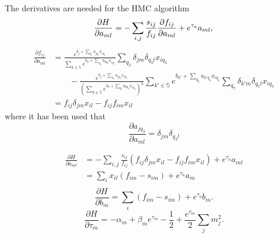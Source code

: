 \begin{example}
	The derivatives are needed for the HMC algorithm
	\begin{equation}
		\frac{\partial H}{\partial a_{ml}} = -\sum_{i,j}\frac{s_{ij}}{f_{ij}}\frac{\partial f_{ij}}{\partial a_{ml}}+e^{\tau_a}a_{ml},\\
	\end{equation}
	\begin{equation}
		\begin{split}
			\frac{\partial f_{ij}}{\partial a_{ml}} & = \frac{e^{b_j+\sum_{q_1}a_{jq_1}x_{iq_1}}}{\sum_{k\in \mathbb{S}}e^{b_k+\sum_{q_2}a_{kq_2}x_{iq_2}}}\sum_{q_3}\delta_{jm}\delta_{q_3l}x_{iq_3}\\
			&\qquad-\frac{e^{b_j+\sum_{q_4}a_{jq_4}x_{iq_4}}}{(\sum_{k\in \mathbb{S}}e^{b_k+\sum_{q_5}a_{kq_5}x_{iq_5}})^2}\sum_{k'\in \mathbb{S}}e^{b_{k'}+\sum_{q_6}a_{k'q_6}x_{iq_6}}\sum_{q_7}\delta_{k'm}\delta_{q_7l}x_{iq_7}\\
			& = f_{ij}\delta_{jm}x_{il}- f_{ij}f_{im}x_{il}
		\end{split}
	\end{equation}
	where it has been used that
	\begin{equation}
		\frac{\partial a_{jq_3}}{\partial a_{ml}} = \delta_{jm}\delta_{q_3l}
	\end{equation}
	
	\begin{equation}
		\begin{split}
			\frac{\partial H}{\partial a_{ml}} &= -\sum_{i,j}\frac{s_{ij}}{f_{ij}}(f_{ij}\delta_{jm}x_{il}- f_{ij}f_{im}x_{il})+e^{\tau_a}a_{ml}\\
			& = \sum_ix_{il}(f_{im}-s_{im})+e^{\tau_a}a_m\\
		\end{split}
	\end{equation}
	\begin{equation}
		\frac{\partial H}{\partial b_m} = \sum_i(f_{im}-s_{im})+e^{\tau_b}b_m.
	\end{equation}
	\begin{equation}
		\frac{\partial H}{\partial \tau_m} = -\alpha_m+\beta_me^{\tau_m}-\frac{1}{2}+\frac{e^{\tau_m}}{2}\sum_jm_j^2.
	\end{equation}
	

\end{example}
